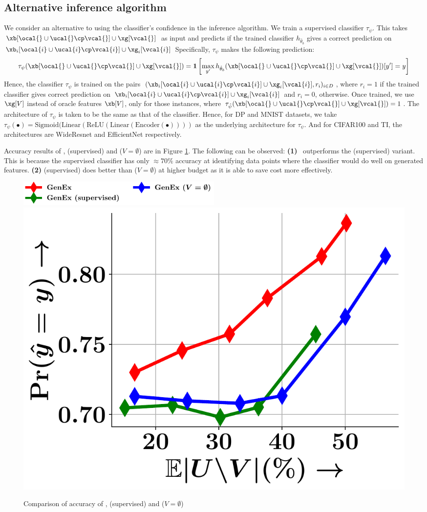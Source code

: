 \documentclass[letterpaper]{article}
\begin{document}
\subsection{Alternative inference algorithm}
We consider an alternative to using the classifier's confidence in the inference algorithm. We train a supervised classifier $\tau_{\psi}$. This takes $\xb[\ocal{} \cup \ucal{}\cp\vcal{}]\cup \xg[\vcal{}]$   as input and  predicts if the trained classifier $  h_{\hat{\theta}_b}$ gives a correct prediction on $\xb_i[\ocal{i} \cup \ucal{i}\cp\vcal{i}]\cup \xg_i[\vcal{i}]$
Specifically, $\tau_{\psi}$ makes the following prediction:
\begin{align}
\tau_{\psi}(\xb[\ocal{} \cup \ucal{}\cp\vcal{}]\cup \xg[\vcal{}]) = \mathbf{1}\left[\max_{y'}   h_{\hat{\theta}_b}(\xb[\ocal{} \cup \ucal{}\cp\vcal{}]\cup \xg[\vcal{}])[y']=y\right]
\end{align}
Hence, the classifier $\tau_{\psi}$ is trained
on the pairs $(\xb_i[\ocal{i} \cup \ucal{i}\cp\vcal{i}]\cup \xg_i[\vcal{i}], r_i)_{i\in D}$, where $r_i = 1$ if the trained classifier gives correct prediction on $\xb_i[\ocal{i} \cup \ucal{i}\cp\vcal{i}]\cup \xg_i[\vcal{i}]$ and $r_i =0$, otherwise. Once trained,  we use $\xg[V]$ instead of oracle features $\xb[V]$, only for those instances, where $\tau_{\hat{\psi}}(\xb[\ocal{} \cup \ucal{}\cp\vcal{}]\cup \xg[\vcal{}]) =1$. The architecture of $\tau_{\psi}$ is taken to be the same as that of the classifier. Hence, for DP and MNIST datasets, we take $\tau_{\psi} (\bullet) =  \text{Sigmoid}(\text{Linear}(\text{ReLU} (\text{Linear}(\text{Encoder}(\bullet))))$ as the underlying architecture for $\tau_{\psi}$. And for CIFAR100 and TI, the architectures are WideResnet and EfficientNet respectively.

 Accuracy results of \our, \our(supervised) and \our($V=\emptyset$) are in Figure \ref{fig:choice_dp}. The following can be observed: \textbf{(1)} \our\ outperforms the \our(supervised) variant. This is because the supervised classifier has only $\approx 70 \%$ accuracy at identifying data points where the classifier would do well on generated features. \textbf{(2)} \our(supervised) does better than \our($V=\emptyset$) at higher budget as it is able to save cost more effectively.
\begin{figure}[h]
    \centering
      \includegraphics[width=0.5\textwidth]{FIG/legend_choice.pdf}\\[-0.5ex]
\includegraphics[width=.3\textwidth]{FIG/choice_dp.pdf}
\caption{\small Comparison of accuracy of \our, \our(supervised) and \our($V=\emptyset$)}
\label{fig:choice_dp}
\end{figure}
\end{document}
